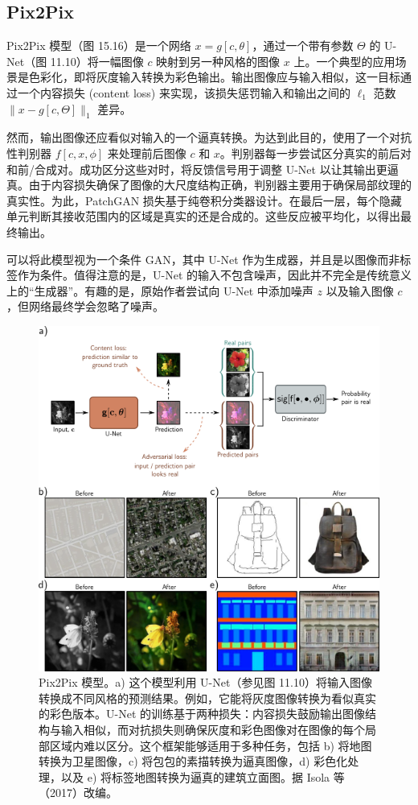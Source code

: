 \subsection{Pix2Pix}
Pix2Pix 模型（图 15.16）是一个网络 \(x = g[c, \theta]\)，通过一个带有参数 \(\Theta\) 的 U-Net（图 11.10）将一幅图像 \(c\) 映射到另一种风格的图像 \(x\) 上。一个典型的应用场景是色彩化，即将灰度输入转换为彩色输出。输出图像应与输入相似，这一目标通过一个内容损失 (content loss) 来实现，该损失惩罚输入和输出之间的 \(\ell_1\) 范数 \(\|x - g[c, \Theta]\|_1\) 差异。

然而，输出图像还应看似对输入的一个逼真转换。为达到此目的，使用了一个对抗性判别器 \(f[c, x, \phi]\) 来处理前后图像 \(c\) 和 \(x\)。判别器每一步尝试区分真实的前后对和前/合成对。成功区分这些对时，将反馈信号用于调整 U-Net 以让其输出更逼真。由于内容损失确保了图像的大尺度结构正确，判别器主要用于确保局部纹理的真实性。为此，PatchGAN 损失基于纯卷积分类器设计。在最后一层，每个隐藏单元判断其接收范围内的区域是真实的还是合成的。这些反应被平均化，以得出最终输出。

可以将此模型视为一个条件 GAN，其中 U-Net 作为生成器，并且是以图像而非标签作为条件。值得注意的是，U-Net 的输入不包含噪声，因此并不完全是传统意义上的“生成器”。有趣的是，原始作者尝试向 U-Net 中添加噪声 \(z\) 以及输入图像 \(c\)，但网络最终学会忽略了噪声。

\begin{figure}[ht!]
\centering
\includegraphics[width=0.7\linewidth]{png/chapter15/GANPix2Pix.png}
\caption{Pix2Pix 模型。a) 这个模型利用 U-Net（参见图 11.10）将输入图像转换成不同风格的预测结果。例如，它能将灰度图像转换为看似真实的彩色版本。U-Net 的训练基于两种损失：内容损失鼓励输出图像结构与输入相似，而对抗损失则确保灰度和彩色图像对在图像的每个局部区域内难以区分。这个框架能够适用于多种任务，包括 b) 将地图转换为卫星图像，c) 将包包的素描转换为逼真图像，d) 彩色化处理，以及 e) 将标签地图转换为逼真的建筑立面图。据 Isola 等（2017）改编。}
\end{figure}


